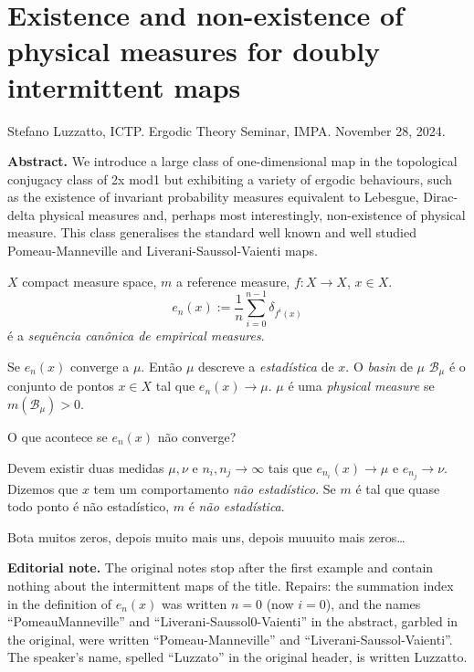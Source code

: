 \section{Existence and non-existence of
physical measures for doubly intermittent
maps}
\label{section-physical-measures-%
intermittent}

\noindent
Stefano Luzzatto, ICTP.
Ergodic Theory Seminar, IMPA.
November 28, 2024.

\medskip\noindent
{\bf Abstract.}
We introduce a large class of one-dimensional
map in the topological conjugacy class of
2x mod1 but exhibiting a variety of ergodic
behaviours, such as the existence of
invariant probability measures equivalent to
Lebesgue, Dirac-delta physical measures and,
perhaps most interestingly, non-existence of
physical measure. This class generalises the
standard well known and well studied
Pomeau-Manneville and
Liverani-Saussol-Vaienti maps.

\medskip{}
$X$ compact measure space, $m$ a reference
measure, $f:X \to X$, $x \in X$.
$$
e_n(x):=\frac{1}{n}\sum_{i=0}^{n-1}
\delta_{f^i(x)}
$$
é a \textit{sequência canônica de empirical
measures}.

Se $e_n(x)$ converge a $\mu$. Então $\mu$
descreve a \textit{estadística}  de $x$. O
\textit{basin} de $\mu$ $\mathcal{B}_\mu$ é o
conjunto de pontos $x \in X$ tal que
$e_n(x)\to \mu$. $\mu$ é uma
\textit{physical measure} se
$m(\mathcal{B}_{\mu})>0$.

\medskip{}
O que acontece se $e_n(x) $ não converge?

Devem existir duas medidas $\mu,\nu$ e
$n_i,n_j\to\infty$ tais que
$e_{n_i}(x)\to \mu$ e $e_{n_j}\to \nu$.
Dizemos que $x$ tem um comportamento
\textit{não estadístico}. Se $m$  é tal que
quase todo ponto é não estadístico, $m$ é
\textit{não estadística}.

\medskip{}
Bota muitos zeros, depois muito mais uns,
depois muuuito mais zeros…

\medskip\noindent
{\bf Editorial note.}
The original notes stop after the first
example and contain nothing about the
intermittent maps of the title. Repairs: the
summation index in the definition of $e_n(x)$
was written $n=0$ (now $i=0$), and the
names ``PomeauManneville'' and
``Liverani-Saussol0-Vaienti'' in the
abstract, garbled in the original, were
written ``Pomeau-Manneville'' and
``Liverani-Saussol-Vaienti''. The
speaker's name, spelled ``Luzzato'' in the
original header, is written Luzzatto.

